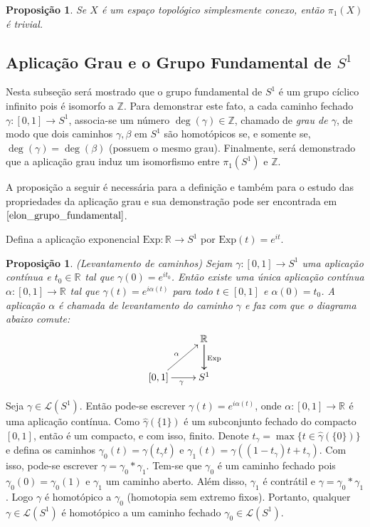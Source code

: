 \documentclass[12pt]{book}
\newtheorem{proposicao}[teorema]{Proposição}
\newcommand{\caminhos}{\mathcal{L}}
\newcommand{\caminhossempontobase}[1]{\caminhos(#1)}
\newcommand{\circulo}{S^{1}}
\newcommand{\Exp}{\text{Exp}}
\newcommand{\grupofundamental}[1]{\pi_{1}(#1)}
\newcommand{\inteiros}{\mathbb{Z}}
\newcommand{\intervalo}{[0,1]}
\newcommand{\real}[1]{\mathbb{R}^{#1}}
\newcommand{\reta}{\real{}}
\begin{document}
	\begin{proposicao}\label{proposicao_grupo_fundamental_simplesmente_conexo}
		Se $X$ é um espaço topológico simplesmente conexo, então $\grupofundamental{X}$ é trivial.
	\end{proposicao}
	
	\subsection{Aplicação Grau e o Grupo Fundamental de $\circulo$}
	Nesta subseção será mostrado que o grupo fundamental de $S^{1}$ é um grupo cíclico infinito pois é isomorfo a $\inteiros$. Para demonstrar este fato, a cada caminho fechado $\gamma:[0,1] \to S^{1}$, associa-se um número $\deg(\gamma) \in \inteiros$, chamado de \textit{grau de $\gamma$}, de modo que dois caminhos $\gamma, \beta$ em $S^{1}$ são homotópicos se, e somente se, $\deg(\gamma) = \deg(\beta)$ (possuem o mesmo grau). Finalmente, será demonstrado que a aplicação grau induz um isomorfismo entre $\pi_{1}(S^{1})$ e $\inteiros$.
	
	A proposição a seguir é necessária para a definição e também para o estudo das propriedades da aplicação grau e sua demonstração pode ser encontrada em $\cite{elon_grupo_fundamental}$.
	
	Defina a aplicação exponencial $\Exp: \reta\to \circulo$ por $\Exp(t) = e^{it}$.
	
	\begin{proposicao}\label{proposicao_levantamento_curvas}
		(Levantamento de caminhos) Sejam $\gamma:\intervalo \to S^{1}$ uma aplicação contínua e $t_{0}\in \real{}$ tal que $\gamma(0) = e^{it_{0}}$. Então existe uma única aplicação contínua $\alpha:\intervalo\to \real{}$ tal que $\gamma(t) = e^{i\alpha(t)}$ para todo $t\in \intervalo$ e $\alpha(0) = t_{0}$. A aplicação $\alpha$ é chamada de levantamento do caminho $\gamma$ e faz com que o diagrama abaixo comute:
		$$
		\xymatrix{
			& \real{}\ar[d]\ar[d]^{\Exp}
			\\
			\intervalo\ar[ur]^{\alpha} \ar[r]_{\gamma} & S^{1}
		}
		$$
	\end{proposicao}
	
	Seja $\gamma \in \caminhossempontobase{\circulo}$. Então pode-se escrever $\gamma(t) = e^{i\alpha(t)}$, onde $\alpha:\intervalo \to \reta$ é uma aplicação contínua. Como $\hat{\gamma} (\{1\})$ é um subconjunto fechado do compacto $\intervalo$, então é um compacto, e com isso, finito. Denote $t_{\gamma} = \max\{t \in \hat{\gamma} (\{0\})\}$ e defina os caminhos $\gamma_{0}(t) = \gamma(t_{\gamma}t)$ e $\gamma_{1}(t) = \gamma((1-t_{\gamma})t+t_{\gamma})$. Com isso, pode-se escrever $\gamma = \gamma_{0}*\gamma_{1}$. Tem-se que $\gamma_{0}$ é um caminho fechado pois $\gamma_{0}(0) = \gamma_{0}(1)$ e $\gamma_{1}$ um caminho aberto. Além disso, $\gamma_{1}$ é contrátil e $\gamma = \gamma_{0}*\gamma_{1}$. Logo $\gamma$ é homotópico a $\gamma_{0}$ (homotopia sem extremo fixos). Portanto, qualquer $\gamma \in \caminhos(\circulo)$ é homotópico a um caminho fechado $\gamma_{0} \in \caminhos(\circulo)$.
	
\end{document}
